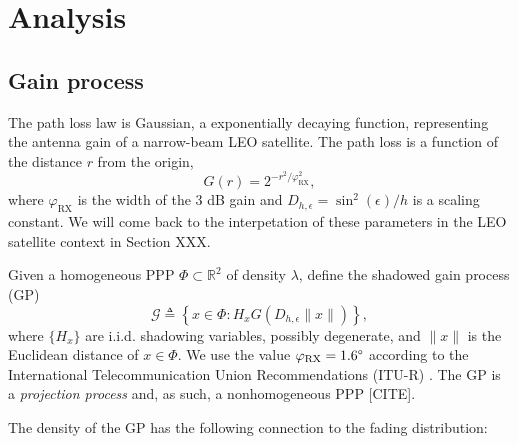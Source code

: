 \documentclass[conference]{IEEEtran}
\newcommand{\R}{\mathbb{R}}
\theoremstyle{definition}
\theoremstyle{plain}
\begin{document}
         
         \section{Analysis}
         
         \subsection{Gain process}

         The path loss law is Gaussian, a exponentially decaying function, representing the antenna gain of a narrow-beam LEO satellite. The path loss is a function of the distance $r$ from the origin, 
         \begin{equation}
           G(r) = 2^{-r^2/\varphi^2_{\text{RX}}},
         \end{equation}
         where $\varphi_{\text{RX}}$ is the width of the $3$ dB gain and $D_{h,\epsilon}=\sin^2(\epsilon)/h$ is a scaling constant. We will come back to the interpetation of these parameters in the LEO satellite context in Section XXX. 
          

         Given a homogeneous PPP $\Phi \subset \R^2$ of density $\lambda$, define the shadowed gain process (GP)
         \begin{equation}
           \label{eq:gainprocess}
           \mathcal{G} \triangleq \left\{x \in \Phi : H_x G(D_{h,\epsilon}\|x\|) \right\},
          \end{equation}
          where $\{H_x\}$ are i.i.d. shadowing variables, possibly degenerate, and $\|x\|$ is the Euclidean distance of $x \in \Phi$. We use the value $\varphi_{\text{RX}} = 1.6 \degree$ according to the International Telecommunication Union Recommendations (ITU-R) \cite{ITURS1528}. The GP is a \textit{projection process} and, as such, a nonhomogeneous PPP [CITE].

          The density of the GP has the following connection to the fading distribution:
\end{document}
